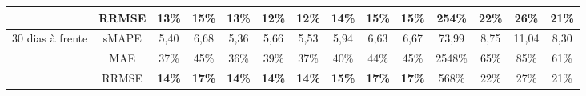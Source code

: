 \begin{landscape}
\begin{table}[htpb!]
\begin{tabular}{@{}cccccccccccccc@{}}
		& RRMSE    & \textbf{13\%} & \textbf{15\%} & \textbf{13\%} & \textbf{12\%} & \textbf{12\%} & \textbf{14\%} & \textbf{15\%} & \textbf{15\%} & 254\%         & 22\% & 26\%  & 21\% \\ \midrule
		\multirow{3}{*}{30 dias à frente} & sMAPE    & 5,40          & 6,68          & 5,36          & 5,66          & 5,53          & 5,94          & 6,63          & 6,67          & 73,99         & 8,75 & 11,04 & 8,30 \\
		& MAE      & 37\%          & 45\%          & 36\%          & 39\%          & 37\%          & 40\%          & 44\%          & 45\%          & 2548\%        & 65\% & 85\%  & 61\% \\
		& RRMSE    & \textbf{14\%} & \textbf{17\%} & \textbf{14\%} & \textbf{14\%} & \textbf{14\%} & \textbf{15\%} & \textbf{17\%} & \textbf{17\%} & 568\%         & 22\% & 27\%  & 21\% \\ \cmidrule(l){1-14} 
	\end{tabular}
	
\end{table}

\end{landscape}

